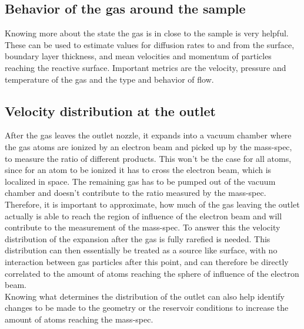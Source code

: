\subsection{Behavior of the gas around the sample}
	Knowing more about the state the gas is in close to the sample is very helpful.
	These can be used to estimate values for diffusion rates to and from the surface, boundary layer thickness, and mean velocities and momentum of particles reaching the reactive surface. 
	Important metrics are the velocity, pressure and temperature of the gas and the type and behavior of flow.

\subsection{Velocity distribution at the outlet}
	After the gas leaves the outlet nozzle, it expands into a vacuum chamber where the gas atoms are ionized by an electron beam and picked up by the mass-spec, to measure the ratio of different products.
	This won't be the case for all atoms, since for an atom to be ionized it has to cross the electron beam, which is localized in space.
	The remaining gas has to be pumped out of the vacuum chamber and doesn't contribute to the ratio measured by the mass-spec.
	Therefore, it is important to approximate, how much of the gas leaving the outlet actually is able to reach the region of influence of the electron beam and will contribute to the measurement of the mass-spec.
	To answer this the velocity distribution of the expansion after the gas is fully rarefied is needed.
	This distribution can then essentially be treated as a source like surface, with no interaction between gas particles after this point, and can therefore be directly correlated to the amount of atoms reaching the sphere of influence of the electron beam.\\
	Knowing what determines the distribution of the outlet can also help identify changes to be made to the geometry or the reservoir conditions to increase the amount of atoms reaching the mass-spec.
